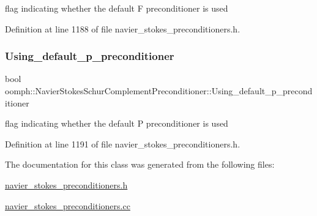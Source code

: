 flag indicating whether the default F preconditioner is used 



Definition at line 1188 of file navier\+\_\+stokes\+\_\+preconditioners.\+h.

\mbox{\label{classoomph_1_1NavierStokesSchurComplementPreconditioner_a6d9eb3bdee67fafd228e0923e61bd812}} 
\subsubsection{\texorpdfstring{Using\+\_\+default\+\_\+p\+\_\+preconditioner}{Using\_default\_p\_preconditioner}}
{\footnotesize\ttfamily bool oomph\+::\+Navier\+Stokes\+Schur\+Complement\+Preconditioner\+::\+Using\+\_\+default\+\_\+p\+\_\+preconditioner\hspace{0.3cm}{\ttfamily [private]}}



flag indicating whether the default P preconditioner is used 



Definition at line 1191 of file navier\+\_\+stokes\+\_\+preconditioners.\+h.



The documentation for this class was generated from the following files\+:\begin{DoxyCompactItemize}
\item 
\hyperlink{navier__stokes__preconditioners_8h}{navier\+\_\+stokes\+\_\+preconditioners.\+h}\item 
\hyperlink{navier__stokes__preconditioners_8cc}{navier\+\_\+stokes\+\_\+preconditioners.\+cc}\end{DoxyCompactItemize}
